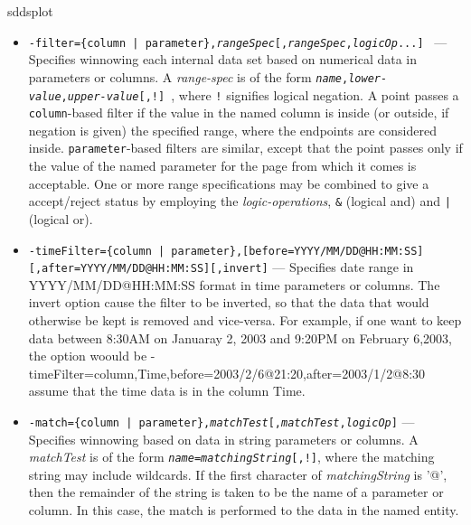 \begin{sddsprog}{sddsplot}
\begin{itemize}
\begin{itemize}
   \item {\tt -filter=\{column | parameter\},{\em rangeSpec}[,{\em rangeSpec},{\em logicOp}...] }
--- Specifies winnowing each internal data set based on numerical data in parameters or columns.  A
{\em range-spec} is of the form {\tt {\em name},{\em lower-value},{\em upper-value}[,!] }, where
\verb|!| signifies logical negation.  A point passes a {\tt column}-based filter if the value in the
named column is inside (or outside, if negation is given) the specified range, where the endpoints
are considered inside.  {\tt parameter}-based filters are similar, except that the point passes only
if the value of the named parameter for the page from which it comes is acceptable.  One or more
range specifications may be combined to give a accept/reject status by employing the {\em
logic-operations}, \verb|&| (logical and) and \verb&|& (logical or).
     \item {\tt -timeFilter=\{column | parameter\},[before=YYYY/MM/DD@HH:MM:SS] [,after=YYYY/MM/DD@HH:MM:SS][,invert]} 
--- Specifies date range in YYYY/MM/DD@HH:MM:SS format in time parameters or columns. The invert option cause the
filter to be inverted, so that the data that would otherwise be kept is removed and vice-versa. For example,
if one want to keep data between 8:30AM on Januaray 2, 2003 and 9:20PM on February 6,2003, the option woould be
     -timeFilter=column,Time,before=2003/2/6@21:20,after=2003/1/2@8:30
assume that the time data is in the column Time.
   \item {\tt -match=\{column | parameter\},{\em matchTest}[,{\em matchTest},{\em logicOp}]} ---
Specifies winnowing based on data in string parameters or columns.  A {\em matchTest} is of the form
{\tt {\em name}={\em matchingString}[,!]}, where the matching string may include wildcards.
If the first character of {\em matchingString} is '@', then the remainder of the string is taken to
be the name of a parameter or column.  In this case, the match is performed to the data in the named
entity.


\end{itemize}
\end{itemize}
\end{sddsprog}
